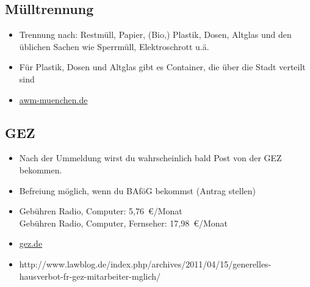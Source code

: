 \documentclass[twoside,12pt,parskip=half-]{scrartcl}
\begin{document}
\subsection{Mülltrennung}
\begin{itemize}
	\item Trennung nach: Restmüll, Papier, (Bio,) Plastik, Dosen, Altglas und den üblichen Sachen wie Sperrmüll, Elektroschrott u.ä.
	\item Für Plastik, Dosen und Altglas gibt es Container, die über die Stadt verteilt sind
	\item \url{awm-muenchen.de}
\end{itemize}


\subsection{GEZ}
\begin{itemize}
	\item Nach der Ummeldung wirst du wahrscheinlich bald Post von der GEZ bekommen.
	\item Befreiung möglich, wenn du BAföG bekommst (Antrag stellen)
	\item Gebühren Radio, Computer: 5,76~€/Monat \\
Gebühren Radio, Computer, Fernseher: 17,98~€/Monat
        \item \url{gez.de}
        \item http://www.lawblog.de/index.php/archives/2011/04/15/generelles-hausverbot-fr\newline -gez-mitarbeiter-mglich/
\end{itemize}
\end{document}
